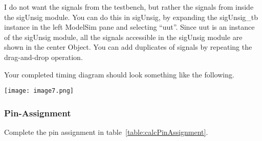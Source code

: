 I do not want the signals from the testbench, but rather the signals
from inside the sigUnsig module. You can do this in sigUnsig, by
expanding the sigUnsig\_tb instance in the left ModelSim pane and
selecting ``uut''. Since uut is an instance of the sigUnsig module, all
the signals accessible in the sigUnsig module are shown in the center
Object. You can add duplicates of signals by repeating the drag-and-drop
operation.

Your completed timing diagram should look something like the following.

\texttt{[image:  image7.png]}

\subsubsection{Pin-Assignment}

Complete the pin assignment in table~\ref{table:calcPinAssignment}.

